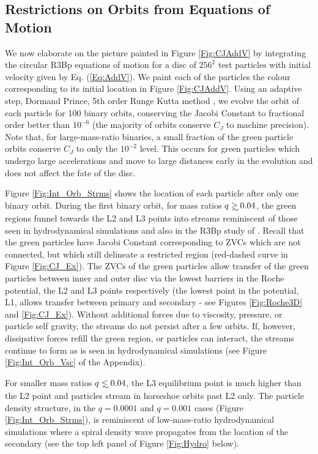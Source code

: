 \documentclass[usenatbib]{mnras}
\newcommand\lsim{\mathrel{\rlap{\lower4pt\hbox{\hskip1pt$\sim$}}
        \raise1pt\hbox{$<$}}}
\newcommand\gsim{\mathrel{\rlap{\lower4pt\hbox{\hskip1pt$\sim$}}
        \raise1pt\hbox{$>$}}}
\begin{document}
\subsection{Restrictions on Orbits from Equations of Motion}
\label{Integration of the equations of motion}
We now elaborate on the picture painted in Figure \ref{Fig:CJAddV} by
integrating the circular R3Bp equations of motion for a disc of
$256^2$ test particles with initial velocity given by
Eq. (\ref{Eq:AddV}). We paint each of the particles the colour
corresponding to its initial location in Figure
\ref{Fig:CJAddV}. Using an adaptive step, Dormand Prince, 5th order
Runge Kutta method \citep{NumRec:2007}, we evolve the orbit of each
particle for 100 binary orbits, conserving the Jacobi
Constant to fractional order better than $10^{-6}$ (the majority of
orbits conserve $C_J$ to machine precision). Note that, for
large-mass-ratio binaries, a small fraction of the green particle orbits
conserve $C_J$ to only the $10^{-2}$ level. This occurs for green
particles which undergo large accelerations and move to large
distances early in the evolution and does not affect the fate of the
disc.



Figure \ref{Fig:Int_Orb_Strms} shows the location of each particle
after only one binary orbit. During the first binary orbit, for mass
ratios $q \gsim 0.04$, the green regions funnel towards the L2 and L3
points into streams reminiscent of those seen in hydrodynamical
simulations and also in the R3Bp study of
\cite{DHM:2013:MNRAS}. Recall that the green particles have Jacobi
Constant corresponding to ZVCs which are not connected, but which
still delineate a restricted region (red-dashed curve in Figure
\ref{Fig:CJ_Ex}). The ZVCs of the green particles allow transfer of the green particles
between inner and outer disc via the lowest barriers in the Roche
potential, the L2 and L3 points respectively (the lowest point in the
potential, L1, allows transfer between primary and secondary - see Figures \ref{Fig:Roche3D} and \ref{Fig:CJ_Ex}). Without
additional forces due to viscosity, pressure, or particle self gravity, the streams do not
persist after a few orbits. If, however, dissipative forces refill the
green region, or particles can interact, the streams continue to form as is seen in
hydrodynamical simulations (see Figure \ref{Fig:Int_Orb_Vsc} of the
Appendix).


For smaller mass ratios $q \lsim 0.04$, the L3 equilibrium point is
much higher than the L2 point and particles stream in horseshoe orbits
past L2 only. The particle density structure, in the $q=0.0001$ and $q=0.001$ cases 
(Figure \ref{Fig:Int_Orb_Strms}), is reminiscent of low-mass-ratio hydrodynamical
simulations where a spiral density wave propagates from the location of the secondary 
(see the top left panel of Figure \ref{Fig:Hydro} below).
\end{document}

